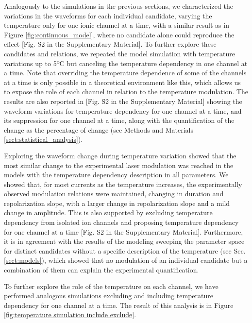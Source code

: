 Analogously to the simulations in the previous sections, we characterized the variations in the waveforms for each individual candidate, varying the temperature only for one ionic-channel at a time, with a similar result as in Figure \ref{fig:continuous_model}, where no candidate alone could reproduce the effect [Fig. S2 in the Supplementary Material]. To further explore these candidates and relations, we repeated the model simulation with temperature variations up to 5ºC but canceling the temperature dependency in one channel at a time. Note that overriding the temperature dependence of some of the channels at a time is only possible in a theoretical environment like this, which allows us to expose the role of each channel in relation to the temperature modulation. The results are also reported in [Fig. S2 in the Supplementary Material] showing the waveform variations for temperature dependency for one channel at a time, and its suppression for one channel at a time, along with the quantification of the change as the percentage of change (see Methods and Materials \ref{sect:statistical_analysis}). 

Exploring the waveform change during temperature variation showed that the most similar change to the experimental laser modulation was reached in the models with the temperature dependency description in all parameters. We showed that, for most currents as the temperature increases, the experimentally observed modulation relations were maintained, changing in duration and repolarization slope, with a larger change in repolarization slope and a mild change in amplitude. This is also supported by excluding temperature dependency from isolated ion channels and proposing temperature dependency for one channel at a time [Fig. S2 in the Supplementary Material]. Furthermore, it is in agreement with the results of the modeling sweeping the parameter space for distinct candidates without a specific description of the temperature (see Sec. \ref{sect:models}), which showed that no modulation of an individual candidate but a combination of them can explain the experimental quantification.


To further explore the role of the temperature on each channel, we have performed analogous simulations excluding and including temperature dependency for one channel at a time. The result of this analysis is in Figure \ref{fig:temperature simulation include exclude}. 


